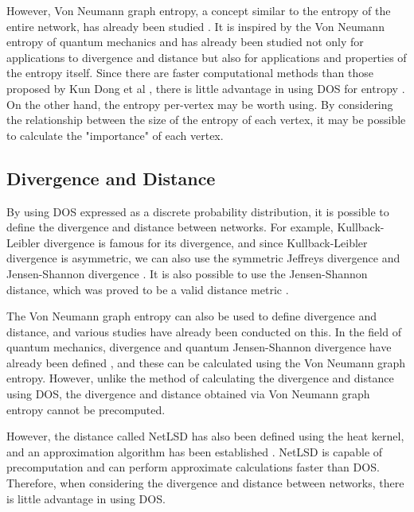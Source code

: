 \documentclass[senior,final,11pt]{iscs-thesis}
\begin{document}
However, Von Neumann graph entropy, a concept similar to the entropy of the entire network, has already been studied \cite{braunstein2006laplacian, chen2019fast,tsitsulin2020just}. It is inspired by the Von Neumann entropy of quantum mechanics and has already been studied not only for applications to divergence and distance but also for applications and properties of the entropy itself. Since there are faster computational methods \cite{chen2019fast,tsitsulin2020just} than those proposed by Kun Dong et al \cite{dong2019network}, there is little advantage in using DOS for entropy .
On the other hand, the entropy per-vertex may be worth using. By considering the relationship between the size of the entropy of each vertex, it may be possible to calculate the "importance" of each vertex.


\subsection{Divergence and Distance}
By using DOS expressed as a discrete probability distribution, it is possible to define the divergence and distance between networks. For example, Kullback-Leibler divergence \cite{kullback1951information} is famous for its divergence, and since Kullback-Leibler divergence is asymmetric, we can also use the symmetric Jeffreys divergence and Jensen-Shannon divergence \cite{nielsen2019jensen, lin1991divergence, jeffreys1946invariant}. It is also possible to use the Jensen-Shannon distance, which was proved to be a valid distance metric \cite{endres2003new}.

The Von Neumann graph entropy can also be used to define divergence and distance, and various studies have already been conducted on this. In the field of quantum mechanics, divergence and quantum Jensen-Shannon divergence have already been defined \cite{briet2009properties, lamberti2008metric}, and these can be calculated using the Von Neumann graph entropy. However, unlike the method of calculating the divergence and distance using DOS, the divergence and distance obtained via Von Neumann graph entropy cannot be precomputed.

However, the distance called NetLSD has also been defined using the heat kernel, and an approximation algorithm has been established \cite{tsitsulin2018netlsd,tsitsulin2020just}. NetLSD is capable of precomputation and can perform approximate calculations faster than DOS. Therefore, when considering the divergence and distance between networks, there is little advantage in using DOS.
\end{document}
